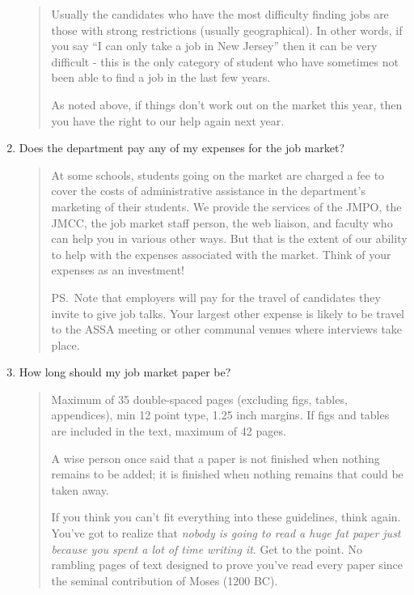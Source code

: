 \documentclass{\classes/econtex}
\begin{document}
\begin{enumerate}
\begin{quote}
    Usually the candidates who have the most difficulty finding jobs are
    those with strong restrictions (usually geographical).  In other
    words, if you say ``I can only take a job in New Jersey'' then it can
    be very difficult - this is the only category of student who 
    have sometimes not been able to find a job in the last few years.

    As noted above, if things don't work out on the market this year, then
    you have the right to our help again next year.

  \end{quote}

\item  Does the department pay any of my expenses for the job market?

  \begin{quote}  
    At some schools, students going on the market are charged a fee to cover the costs of administrative assistance in the department's marketing of their students.  We provide the services of the JMPO, the JMCC, the job market staff person, the web liaison, and faculty who can help you in various other ways.  But that is the extent of our ability to help with the expenses associated with the market.  Think of your expenses as an investment!

    PS.\ Note that employers will pay for the travel of candidates they invite to give job talks. Your largest other expense is likely to be travel to the ASSA meeting or other communal venues where interviews take place.

  \end{quote}

\item  How long should my job market paper be?

  \begin{quote}
    Maximum of 35 double-spaced pages (excluding figs, tables,
    appendices), min 12 point type, 1.25 inch margins.  If figs and
    tables are included in the text, maximum of 42 pages.   
    
    A wise person once said that a paper is not finished when nothing
    remains to be added; it is finished when nothing remains that could
    be taken away.
    
    If you think you can't fit everything into these guidelines, think
    again.  You've got to realize that \textit{nobody is going to read a
      huge fat paper just because you spent a lot of time writing it}.
    Get to the point.  No rambling pages of text designed to prove you've
    read every paper since the seminal contribution of Moses (1200 BC).


\end{quote}
\end{enumerate}
\end{document}
